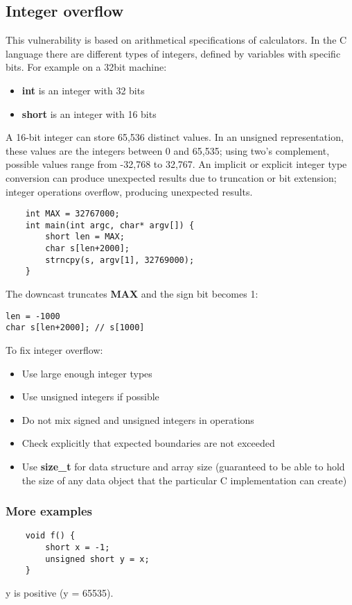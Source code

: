 \documentclass[a4paper, 10pt, titlepage]{article}
\begin{document}
\subsection*{Integer overflow}
This vulnerability is based on arithmetical specifications of calculators. In the C language there are different types of integers, defined by variables with specific bits. For example on a 32bit machine:
\begin{itemize}
\item \textbf{int} is an integer with 32 bits
\item \textbf{short} is an integer with 16 bits
\end{itemize}
A 16-bit integer can store 65,536 distinct values. In an unsigned representation, these values are the integers between 0 and 65,535; using two's complement, possible values range from -32,768 to 32,767.
An implicit or explicit integer type conversion can produce unexpected results due to truncation or bit extension; integer operations overflow, producing unexpected results.
\begin{lstlisting}
	int MAX = 32767000;
	int main(int argc, char* argv[]) {
		short len = MAX;
		char s[len+2000];
		strncpy(s, argv[1], 32769000);
	}
\end{lstlisting}
The downcast truncates \textbf{MAX} and the sign bit becomes 1:
\begin{verbatim}
len = -1000
char s[len+2000]; // s[1000]
\end{verbatim}
To fix integer overflow:
\begin{itemize}
\item Use large enough integer types
\item Use unsigned integers if possible
\item Do not mix signed and unsigned integers in operations
\item Check explicitly that expected boundaries are not exceeded
\item Use \textbf{size\_t} for data structure and array size (guaranteed to be able to hold the size of any data object that the particular C implementation can create)
\end{itemize}

\subsubsection*{More examples}
\begin{lstlisting}
	void f() {
		short x = -1;
		unsigned short y = x;
	}
\end{lstlisting}
y is positive (y = 65535).
\end{document}
